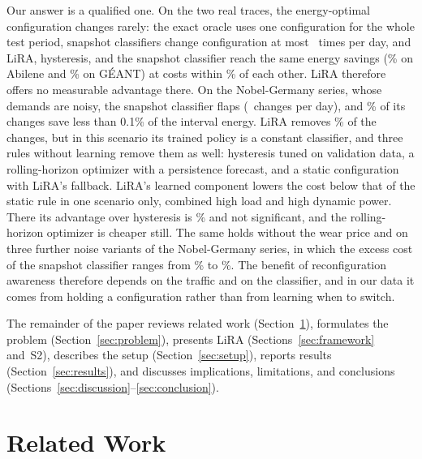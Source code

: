 \documentclass[5p,times]{elsarticle}
\begin{document}
Our answer is a qualified one. On the two real traces, the energy-optimal configuration changes rarely: the exact oracle uses one configuration for the whole test period, snapshot classifiers change configuration at most \abiBFourchg\ times per day, and LiRA, hysteresis, and the snapshot classifier reach the same energy savings (\abiSav\% on Abilene and \geaSav\% on G\'{E}ANT) at costs within \realSpread\% of each other. LiRA therefore offers no measurable advantage there. On the Nobel-Germany series, whose demands are noisy, the snapshot classifier flaps (\nobBFourchg\ changes per day), and \gainTenthShare\% of its changes save less than 0.1\% of the interval energy. LiRA removes \nobY\% of the changes, but in this scenario its trained policy is a constant classifier, and three rules without learning remove them as well: hysteresis tuned on validation data, a rolling-horizon optimizer with a persistence forecast, and a static configuration with LiRA's fallback. LiRA's learned component lowers the cost below that of the static rule in one scenario only, combined high load and high dynamic power. There its advantage over hysteresis is \nobstGainPct\% and not significant, and the rolling-horizon optimizer is cheaper still. The same holds without the wear price and on three further noise variants of the Nobel-Germany series, in which the excess cost of the snapshot classifier ranges from \nzhalfExcess\% to \nzarAExcess\%. The benefit of reconfiguration awareness therefore depends on the traffic and on the classifier, and in our data it comes from holding a configuration rather than from learning when to switch.

The remainder of the paper reviews related work (Section~\ref{sec:related}), formulates the problem (Section~\ref{sec:problem}), presents LiRA (Sections~\ref{sec:framework} and~S2), describes the setup (Section~\ref{sec:setup}), reports results (Section~\ref{sec:results}), and discusses implications, limitations, and conclusions (Sections~\ref{sec:discussion}--\ref{sec:conclusion}).

\section{Related Work}\label{sec:related}
\end{document}
